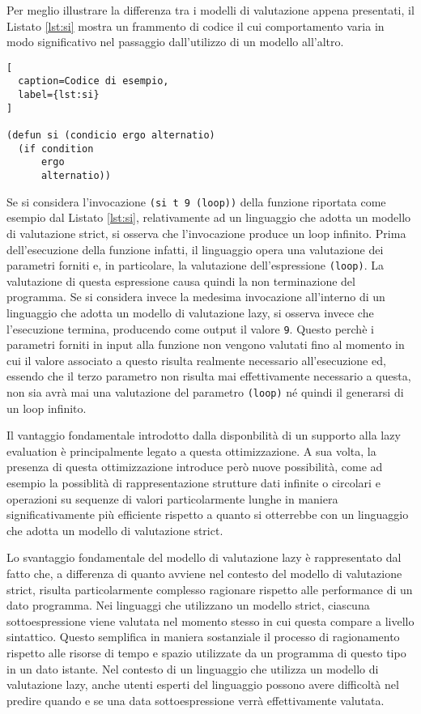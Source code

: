 Per meglio illustrare la differenza tra i modelli di valutazione appena presentati, il Listato \ref{lst:si} mostra un frammento di codice il cui comportamento varia in modo significativo nel passaggio dall'utilizzo di un modello all'altro.

\begin{lstlisting}[
  caption=Codice di esempio,
  label={lst:si}
]

(defun si (condicio ergo alternatio)
  (if condition
      ergo
      alternatio))

\end{lstlisting}

Se si considera l'invocazione \texttt{(si t 9 (loop))} della funzione riportata come esempio dal Listato \ref{lst:si}, relativamente ad un linguaggio che adotta un modello di valutazione strict, si osserva che l'invocazione produce un loop infinito. Prima dell'esecuzione della funzione infatti, il linguaggio opera una valutazione dei parametri forniti e, in particolare, la valutazione dell'espressione \texttt{(loop)}. La valutazione di questa espressione causa quindi la non terminazione del programma. Se si considera invece la medesima invocazione all'interno di un linguaggio che adotta un modello di valutazione lazy, si osserva invece che l'esecuzione termina, producendo come output il valore \texttt{9}. Questo perchè i parametri forniti in input alla funzione non vengono valutati fino al momento in cui il valore associato a questo risulta realmente necessario all'esecuzione ed, essendo che il terzo parametro non risulta mai effettivamente necessario a questa, non sia avrà mai una valutazione del parametro \texttt{(loop)} né quindi il generarsi di un loop infinito.

Il vantaggio fondamentale introdotto dalla disponbilità di un supporto alla lazy evaluation è principalmente legato a questa ottimizzazione. A sua volta, la presenza di questa ottimizzazione introduce però nuove possibilità, come ad esempio la possiblità di rappresentazione strutture dati infinite o circolari e operazioni su sequenze di valori particolarmente lunghe in maniera significativamente più efficiente rispetto a quanto si otterrebbe con un linguaggio che adotta un modello di valutazione strict.

Lo svantaggio fondamentale del modello di valutazione lazy è rappresentato dal fatto che, a differenza di quanto avviene nel contesto del modello di valutazione strict, risulta particolarmente complesso ragionare rispetto alle performance di un dato programma. Nei linguaggi che utilizzano un modello strict, ciascuna sottoespressione viene valutata nel momento stesso in cui questa compare a livello sintattico. Questo semplifica in maniera sostanziale il processo di ragionamento rispetto alle risorse di tempo e spazio utilizzate da un programma di questo tipo in un dato istante. Nel contesto di un linguaggio che utilizza un modello di valutazione lazy, anche utenti esperti del linguaggio possono avere difficoltà nel predire quando e se una data sottoespressione verrà effettivamente valutata.

